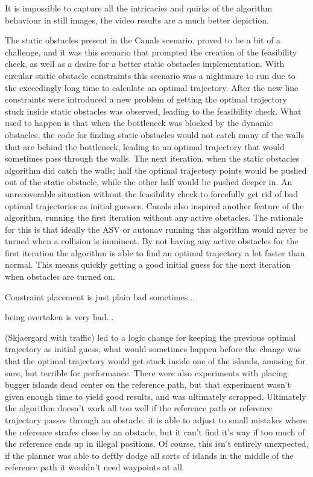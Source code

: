 It is impossible to capture all the intricacies and quirks of the algorithm behaviour in still images, the video results are a
much better depiction.

The static obstacles present in the Canals scenario. proved to be a bit of a challenge, and it was this scenario that prompted the creation of the feasibility check, as well as
a desire for a better static obstacles implementation. With circular static obstacle constraints this scenario was a nightmare to run due to the exceedingly long
time to calculate an optimal trajectory. After the new line constraints were introduced a new problem of getting the optimal trajectory
stuck inside static obstacles was observed, leading to the feasibility check. What used to happen is that when the bottleneck
was blocked by the dynamic obstacles, the code for finding static obstacles would not catch many of the walls that are behind the bottleneck, leading to
an optimal trajectory that would sometimes pass through the walls. The next iteration, when the static obstacles algorithm did catch the walls; half
the optimal trajectory points would be pushed out of the static obstacle, while the other half would be pushed deeper in. An unrecoverable situation without
the feasibility check to forcefully get rid of bad optimal trajectories as initial guesses.\newline
Canals also inspired another feature of the algorithm, running the first iteration without any active obstacles. The rationale for this is that
ideally the \gls{ASV} or autonav running this algorithm would never be turned when a collision is imminent. By not having any active obstacles for the first
iteration the algorithm is able to find an optimal trajectory a lot faster than normal. This means quickly getting a good initial guess for the next
iteration when obstacles are turned on.

Constraint placement is just plain bad sometimes...

being overtaken is very bad...

(Skjaergard with traffic) led to a logic change for keeping the previous optimal trajectory as initial guess, what would sometimes happen before the change was
that the optimal trajectory would get stuck inside one of the islands, amusing for sure, but terrible for performance.
There were also experiments with placing bugger islands dead center on the reference path, but that experiment wasn't given enough
time to yield good results, and was ultimately scrapped. Ultimately the algorithm doesn't work all too well if the reference path or reference trajectory
passes through an obstacle. it is able to adjust to small mistakes where the reference strafes close by an obstacle, but it can't find it's way if too much of
the reference ends up in illegal positions.
Of course, this isn't entirely unexpected, if the planner was able to deftly dodge all sorts of islands in the middle of the reference path it wouldn't need waypoints at all.
